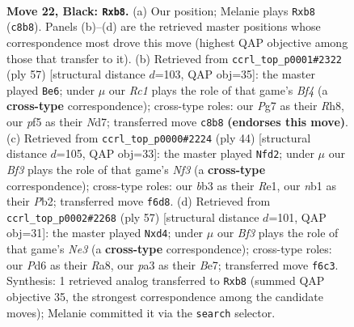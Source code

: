 \documentclass[11pt]{article}
\begin{document}
\clearpage

\begin{figure}[p]\centering
\begin{subfigure}{0.46\textwidth}\centering
\resizebox{\linewidth}{!}{%
\newchessgame
\chessboard[
  setfen={1Nr1n1k1/2p2ppp/p2p1b2/5P1b/2P1P2n/PB6/6P1/RNB1R1K1 b - - 0 22},
  showmover=false,
  pgfstyle=straightmove, color=movearrow, markmove={c8-b8}
]}
\caption{}
\end{subfigure}\hfill
\begin{subfigure}{0.46\textwidth}\centering
\resizebox{\linewidth}{!}{%
\newchessgame
\chessboard[
  setfen={1k5r/pp1n2pp/5p2/4pb1P/1PPnN3/2K2P2/P3B1P1/3NR3 b - - 2 29},
  showmover=false,
  pgfstyle=straightmove, color=movearrow, markmove={f5-e6}
]}
\caption{}
\end{subfigure}
\\[4pt]
\begin{subfigure}{0.46\textwidth}\centering
\resizebox{\linewidth}{!}{%
\newchessgame
\chessboard[
  setfen={5bk1/6p1/r1p2p1p/p1pn4/P1N5/2Pb1NB1/1P3PPP/4R1K1 w - - 1 23},
  showmover=false,
  pgfstyle=straightmove, color=movearrow, markmove={f3-d2}
]}
\caption{}
\end{subfigure}\hfill
\begin{subfigure}{0.46\textwidth}\centering
\resizebox{\linewidth}{!}{%
\newchessgame
\chessboard[
  setfen={r5k1/1p2b1pp/p3n2r/4Nb2/PP1B1pP1/2P5/3N1P1P/R2R1K2 b - - 0 29},
  showmover=false,
  pgfstyle=straightmove, color=movearrow, markmove={e6-d4}
]}
\caption{}
\end{subfigure}
\caption{\textbf{Move 22, Black: \texttt{Rxb8}.} (a) Our position; Melanie plays \texttt{Rxb8} (\texttt{c8b8}). Panels (b)--(d) are the retrieved master positions whose correspondence most drove this move (highest QAP objective among those that transfer to it). (b) Retrieved from \texttt{ccrl\_top\_p0001\#2322} (ply 57) [structural distance $d$=103, QAP obj=35]: the master played \texttt{Be6}; under $\mu$ our \emph{Rc1} plays the role of that game's \emph{Bf4} (a \textbf{cross-type} correspondence); cross-type roles: our \emph{P}g7 as their \emph{R}h8, our \emph{p}f5 as their \emph{N}d7; transferred move \texttt{c8b8} \textbf{(endorses this move)}. (c) Retrieved from \texttt{ccrl\_top\_p0000\#2224} (ply 44) [structural distance $d$=105, QAP obj=33]: the master played \texttt{Nfd2}; under $\mu$ our \emph{Bf3} plays the role of that game's \emph{Nf3} (a \textbf{cross-type} correspondence); cross-type roles: our \emph{b}b3 as their \emph{R}e1, our \emph{n}b1 as their \emph{P}b2; transferred move \texttt{f6d8}. (d) Retrieved from \texttt{ccrl\_top\_p0002\#2268} (ply 57) [structural distance $d$=101, QAP obj=31]: the master played \texttt{Nxd4}; under $\mu$ our \emph{Bf3} plays the role of that game's \emph{Ne3} (a \textbf{cross-type} correspondence); cross-type roles: our \emph{P}d6 as their \emph{R}a8, our \emph{p}a3 as their \emph{B}e7; transferred move \texttt{f6c3}. Synthesis: 1 retrieved analog transferred to \texttt{Rxb8} (summed QAP objective 35, the strongest correspondence among the candidate moves); Melanie committed it via the \texttt{search} selector.}
\label{fig:thought-m43}
\end{figure}
\end{document}
